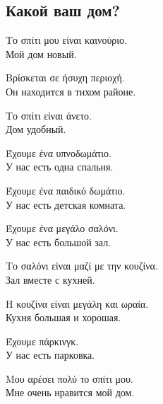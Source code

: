 \documentclass[12pt]{article}
\newcommand{\my}[1]{\textcolor{gray!80!white}{#1}}
\newenvironment{page}{\clearpage\normalsize\null\vfill}{\vfill\null}
\newenvironment{textblock}{\begin{minipage}{\textwidth}}{\end{minipage}\smallskip}
\begin{document}
	\begin{page}
		\subsection{Какой ваш дом?}
		\small
		\begin{textblock}
			Το σπίτι μου είναι καινούριο.\\
			\my{Мой дом новый.}
			
			Βρίσκεται σε ήσυχη περιοχή.\\
			\my{Он находится в тихом районе.}
			
			Το σπίτι είναι άνετο.\\
			\my{Дом удобный.}
			
			Έχουμε ένα υπνοδωμάτιο.\\
			\my{У нас есть одна спальня.}
			
			Έχουμε ένα παιδικό δωμάτιο.\\
			\my{У нас есть детская комната.}
			
			Έχουμε ένα μεγάλο σαλόνι.\\
			\my{У нас есть большой зал.}
			
			Το σαλόνι είναι μαζί με την κουζίνα.\\
			\my{Зал вместе с кухней.}
			
			Η κουζίνα είναι μεγάλη και ωραία.\\
			\my{Кухня большая и хорошая.}
			
			Έχουμε πάρκινγκ.\\
			\my{У нас есть парковка.}
			
			Μου αρέσει πολύ το σπίτι μου.\\
			\my{Мне очень нравится мой дом.}
		\end{textblock}
	\end{page}
\end{document}
